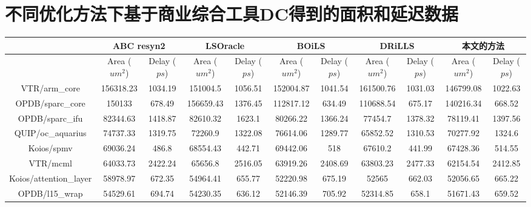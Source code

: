 \chapter{不同优化方法下基于商业综合工具DC得到的面积和延迟数据} \label{所有电路在不同优化方法下的面积和延迟}


{
\tiny
\setlength{\tabcolsep}{1pt}
\begin{longtable}{|*{11}{c|}}
        \hline
        & \multicolumn{2}{|c|}{ABC resyn2} & \multicolumn{2}{|c|}{LSOracle\cite{LS:LSOracle}} & \multicolumn{2}{|c|}{BOiLS\cite{LS:BOiLS}} & \multicolumn{2}{|c|}{DRiLLS\cite{LS:DRiLLS}} & \multicolumn{2}{|c|}{本文的方法}\\
        \hline
        & Area ($um^2$) & Delay ($ps$) & Area ($um^2$) & Delay ($ps$) & Area ($um^2$) & Delay ($ps$) & Area ($um^2$) & Delay ($ps$) & Area ($um^2$) & Delay ($ps$) \\
        \hline
        VTR/arm\_core & 156318.23 & 1034.19 & 151004.5 & 1056.51 & 152004.87 & 1041.54 & 161500.76 & 1031.03 & 146799.08 & 1022.63 \\
        \hline
        OPDB/sparc\_core & 150133 & 678.49 & 156659.43 & 1376.45 & 112817.12 & 634.49 & 110688.54 & 675.17 & 140216.34 & 668.52 \\
        \hline
        OPDB/sparc\_ifu & 82344.63 & 1418.87 & 82610.32 & 1623.1 & 80266.22 & 1366.24 & 77454.7 & 1378.32 & 78119.41 & 1397.56 \\
        \hline
        QUIP/oc\_aquarius & 74737.33 & 1319.75 & 72260.9 & 1322.08 & 76614.06 & 1289.77 & 65852.52 & 1310.53 & 70277.92 & 1324.6 \\
        \hline
        Koios/spmv & 69036.24 & 486.8 & 68554.43 & 442.71 & 69442.06 & 518 & 67610.2 & 441.99 & 67428.36 & 514.55 \\
        \hline
        VTR/mcml & 64033.73 & 2422.24 & 65656.8 & 2516.05 & 63919.26 & 2408.69 & 63803.23 & 2477.33 & 62154.54 & 2412.85 \\
        \hline
        Koios/attention\_layer & 58978.97 & 672.35 & 54964.41 & 655.77 & 52220.98 & 675.19 & 52565 & 662.03 & 52056.65 & 665.22 \\
        \hline
        OPDB/l15\_wrap & 54529.61 & 694.74 & 54230.35 & 636.12 & 52146.39 & 705.92 & 52314.85 & 658.1 & 51671.43 & 659.52 \\

\end{longtable}}
